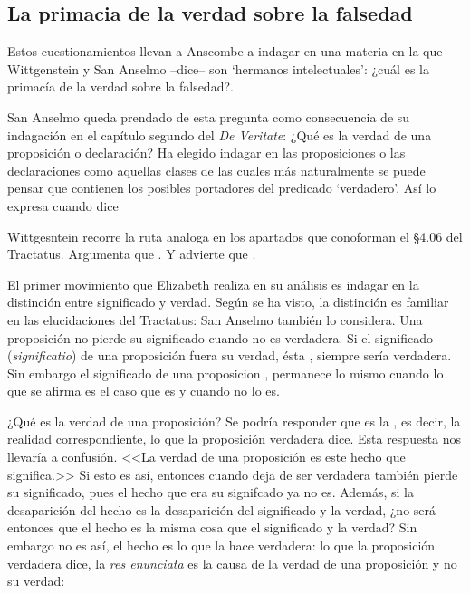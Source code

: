 \subsection{La primacia de la verdad sobre la falsedad}
Estos cuestionamientos llevan a Anscombe a indagar en una materia en la que
Wittgenstein y San Anselmo --dice-- son `hermanos intelectuales': ¿cuál es la
primacía de la verdad sobre la falsedad?.

San Anselmo queda prendado de esta pregunta como consecuencia de su indagación
en el capítulo segundo del \emph{De Veritate}: ¿Qué es la verdad de una
proposición o declaración? Ha elegido indagar en las proposiciones o las
declaraciones como aquellas clases de las cuales más naturalmente se puede
pensar que contienen los posibles portadores del predicado `verdadero'. Así lo
expresa cuando dice \autocite{De Veritate c. 2}

Wittgesntein recorre la ruta analoga en los apartados que conoforman el \S4.06
del Tractatus. Argumenta que \autocite[\S4.06]{wittgenstein1922tractatus}. Y advierte que
\autocite[\S4.061]{wittgenstein1922tractatus}.

El primer movimiento que Elizabeth realiza en su análisis es indagar en la
distinción entre significado y verdad. Según se ha visto, la distinción es
familiar en las elucidaciones del Tractatus: 
\autocite[\S~4.061]{wittgenstein1922tractatus} San Anselmo también lo considera.
Una proposición no pierde su significado cuando no es verdadera. Si el
significado (\emph{significatio}) de una proposición fuera su verdad, ésta
, siempre sería verdadera. Sin embargo el
significado de una proposicion , permanece lo mismo cuando lo que se afirma es el
caso que es y cuando no lo es.

¿Qué es la verdad de una proposición? Se podría responder que es la
, es decir, la realidad correspondiente, lo que
la proposición verdadera dice. Esta respuesta nos llevaría a confusión. <<La
verdad de una proposición es este hecho que significa.>> Si esto es así,
entonces cuando deja de ser verdadera también pierde su significado, pues el
hecho que era su signifcado ya no es. Además, si la desaparición del hecho es la
desaparición del significado y la verdad, ¿no será entonces que el hecho es la
misma cosa que el significado y la verdad? Sin embargo no es así, el hecho es lo
que la hace verdadera: lo que la proposición verdadera dice, la \emph{res
  enunciata} es la causa de la verdad de una proposición y no su verdad:


